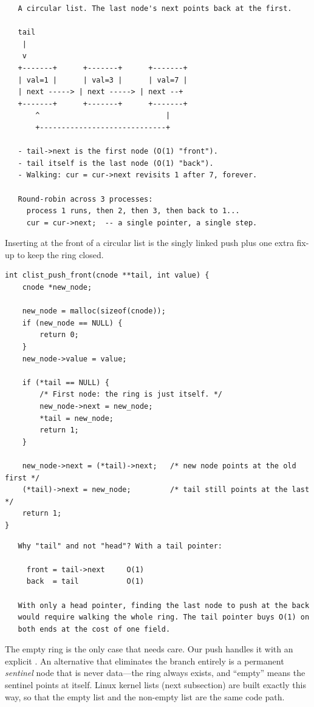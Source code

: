 \begin{verbatim}
   A circular list. The last node's next points back at the first.

   tail
    |
    v
   +-------+      +-------+      +-------+
   | val=1 |      | val=3 |      | val=7 |
   | next -----> | next -----> | next --+
   +-------+      +-------+      +-------+
       ^                             |
       +-----------------------------+

   - tail->next is the first node (O(1) "front").
   - tail itself is the last node (O(1) "back").
   - Walking: cur = cur->next revisits 1 after 7, forever.

   Round-robin across 3 processes:
     process 1 runs, then 2, then 3, then back to 1...
     cur = cur->next;  -- a single pointer, a single step.
\end{verbatim}

Inserting at the front of a circular list is the singly linked push
plus one extra fix-up to keep the ring closed.

\begin{lstlisting}[caption={Push at the front of a circular list.}]
int clist_push_front(cnode **tail, int value) {
    cnode *new_node;

    new_node = malloc(sizeof(cnode));
    if (new_node == NULL) {
        return 0;
    }
    new_node->value = value;

    if (*tail == NULL) {
        /* First node: the ring is just itself. */
        new_node->next = new_node;
        *tail = new_node;
        return 1;
    }

    new_node->next = (*tail)->next;   /* new node points at the old first */
    (*tail)->next = new_node;         /* tail still points at the last    */
    return 1;
}
\end{lstlisting}

\begin{verbatim}
   Why "tail" and not "head"? With a tail pointer:

     front = tail->next     O(1)
     back  = tail           O(1)

   With only a head pointer, finding the last node to push at the back
   would require walking the whole ring. The tail pointer buys O(1) on
   both ends at the cost of one field.
\end{verbatim}

\begin{insight}
The empty ring is the only case that needs care. Our push handles it
with an explicit . An alternative that
eliminates the branch entirely is a permanent \emph{sentinel} node that
is never data---the ring always exists, and ``empty'' means the
sentinel points at itself. Linux kernel lists (next subsection) are
built exactly this way, so that the empty list and the non-empty list
are the same code path.
\end{insight}

